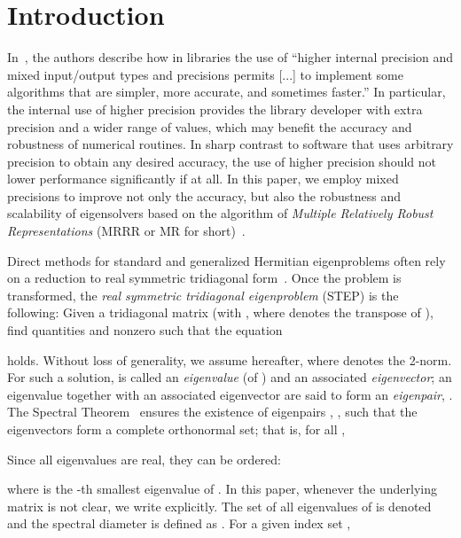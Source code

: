 \documentclass[final]{siamltex}
\begin{document}
\pagestyle{myheadings}
\thispagestyle{plain}


\section{Introduction}
\label{sec:intro}

In~\cite{Li02design}, the authors
describe how in libraries the use of ``higher internal
precision and mixed input/output types and precisions permits
[...] to implement some algorithms that are simpler, more accurate, and
sometimes faster.'' In particular, the internal use of higher precision
provides the 
library developer with extra precision and a wider range of values, which may
benefit the accuracy and robustness of numerical routines. 
In sharp contrast to software that uses
arbitrary precision to obtain any desired accuracy, the use of higher precision should not
lower performance  significantly if at all. In this paper, we employ
mixed precisions to improve not only the accuracy, but also the robustness and
scalability of eigensolvers based on the algorithm of {\it Multiple Relatively
  Robust Representations} (MRRR or MR for
short)~\cite{DesignMRRR,Bientinesi:2005:PMR3,Vomel:2010:ScaLAPACKsMRRR,mr3smp,EleMRRR,Willems:Diss}.  

Direct methods for standard and generalized Hermitian eigenproblems often rely on a
reduction to real symmetric tridiagonal form~\cite{Bai:2000:TSA:357352}. Once the
problem is transformed, the {\it real symmetric tridiagonal eigenproblem} (STEP)
is the following: Given a tridiagonal matrix  (with , where  denotes the transpose of ), find quantities  and nonzero  such that the equation

holds. Without loss of generality, we assume  hereafter,
where  denotes the 2-norm. For such a 
solution,  is called an \textit{eigenvalue} (of ) and  an associated
\textit{eigenvector}; an eigenvalue together with an associated
eigenvector are said to form an \textit{eigenpair}, .
The Spectral Theorem~\cite{Parlett:1998:SEP} ensures the existence of
 eigenpairs , , such that the
eigenvectors form a complete orthonormal set; that is, for all ,   

Since all eigenvalues are
real, they can be ordered:

where  is the -th smallest eigenvalue of . In
this paper, whenever the underlying matrix is not clear, we write
 explicitly. The set of all eigenvalues of  is denoted
 and the spectral diameter is defined as . 
For a given 
index set ,  
\end{document}
